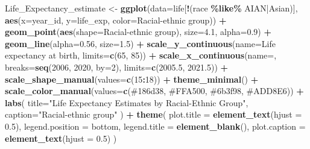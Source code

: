 \documentclass[
]{article}
\newenvironment{Shaded}{\begin{snugshade}}{\end{snugshade}}
\newcommand{\AttributeTok}[1]{\textcolor[rgb]{0.13,0.29,0.53}{#1}}
\newcommand{\DecValTok}[1]{\textcolor[rgb]{0.00,0.00,0.81}{#1}}
\newcommand{\FloatTok}[1]{\textcolor[rgb]{0.00,0.00,0.81}{#1}}
\newcommand{\FunctionTok}[1]{\textcolor[rgb]{0.13,0.29,0.53}{\textbf{#1}}}
\newcommand{\NormalTok}[1]{#1}
\newcommand{\OtherTok}[1]{\textcolor[rgb]{0.56,0.35,0.01}{#1}}
\newcommand{\SpecialCharTok}[1]{\textcolor[rgb]{0.81,0.36,0.00}{\textbf{#1}}}
\newcommand{\StringTok}[1]{\textcolor[rgb]{0.31,0.60,0.02}{#1}}
\begin{document}
\begin{Shaded}
\begin{Highlighting}[]
\NormalTok{Life\_Expectancy\_estimate }\OtherTok{\textless{}{-}} \FunctionTok{ggplot}\NormalTok{(}\AttributeTok{data=}\NormalTok{life[}\SpecialCharTok{!}\NormalTok{(race }\SpecialCharTok{\%like\%} \StringTok{\textquotesingle{}AIAN|Asian\textquotesingle{}}\NormalTok{)], }\FunctionTok{aes}\NormalTok{(}\AttributeTok{x=}\NormalTok{year\_id, }\AttributeTok{y=}\NormalTok{life\_exp, }\AttributeTok{color=}\StringTok{\textasciigrave{}}\AttributeTok{Racial{-}ethnic group}\StringTok{\textasciigrave{}}\NormalTok{)) }\SpecialCharTok{+}
  \FunctionTok{geom\_point}\NormalTok{(}\FunctionTok{aes}\NormalTok{(}\AttributeTok{shape=}\StringTok{\textasciigrave{}}\AttributeTok{Racial{-}ethnic group}\StringTok{\textasciigrave{}}\NormalTok{), }\AttributeTok{size=}\FloatTok{4.1}\NormalTok{, }\AttributeTok{alpha=}\FloatTok{0.9}\NormalTok{) }\SpecialCharTok{+}
  \FunctionTok{geom\_line}\NormalTok{(}\AttributeTok{alpha=}\FloatTok{0.56}\NormalTok{, }\AttributeTok{size=}\FloatTok{1.5}\NormalTok{) }\SpecialCharTok{+}
  \FunctionTok{scale\_y\_continuous}\NormalTok{(}\AttributeTok{name=}\StringTok{\textquotesingle{}Life expectancy at birth\textquotesingle{}}\NormalTok{, }\AttributeTok{limits=}\FunctionTok{c}\NormalTok{(}\DecValTok{65}\NormalTok{, }\DecValTok{85}\NormalTok{)) }\SpecialCharTok{+}
  \FunctionTok{scale\_x\_continuous}\NormalTok{(}\AttributeTok{name=}\StringTok{\textquotesingle{}\textquotesingle{}}\NormalTok{, }\AttributeTok{breaks=}\FunctionTok{seq}\NormalTok{(}\DecValTok{2006}\NormalTok{, }\DecValTok{2020}\NormalTok{, }\AttributeTok{by=}\DecValTok{2}\NormalTok{), }\AttributeTok{limits=}\FunctionTok{c}\NormalTok{(}\FloatTok{2005.5}\NormalTok{, }\FloatTok{2021.5}\NormalTok{)) }\SpecialCharTok{+}
  \FunctionTok{scale\_shape\_manual}\NormalTok{(}\AttributeTok{values=}\FunctionTok{c}\NormalTok{(}\DecValTok{15}\SpecialCharTok{:}\DecValTok{18}\NormalTok{)) }\SpecialCharTok{+}
  \FunctionTok{theme\_minimal}\NormalTok{() }\SpecialCharTok{+}
  \FunctionTok{scale\_color\_manual}\NormalTok{(}\AttributeTok{values=}\FunctionTok{c}\NormalTok{(}\StringTok{\textquotesingle{}\#186d38\textquotesingle{}}\NormalTok{, }\StringTok{\textquotesingle{}\#FFA500\textquotesingle{}}\NormalTok{, }\StringTok{\textquotesingle{}\#6b3f98\textquotesingle{}}\NormalTok{, }\StringTok{\textquotesingle{}\#ADD8E6\textquotesingle{}}\NormalTok{)) }\SpecialCharTok{+}
  \FunctionTok{labs}\NormalTok{(}
    \AttributeTok{title=}\StringTok{"Life Expectancy Estimates by Racial{-}Ethnic Group"}\NormalTok{,}
    \AttributeTok{caption=}\StringTok{"Racial{-}ethnic group"} 
\NormalTok{  ) }\SpecialCharTok{+}
  \FunctionTok{theme}\NormalTok{(}
    \AttributeTok{plot.title =} \FunctionTok{element\_text}\NormalTok{(}\AttributeTok{hjust =} \FloatTok{0.5}\NormalTok{), }
    \AttributeTok{legend.position =} \StringTok{\textquotesingle{}bottom\textquotesingle{}}\NormalTok{,             }
    \AttributeTok{legend.title =} \FunctionTok{element\_blank}\NormalTok{(),         }
    \AttributeTok{plot.caption =} \FunctionTok{element\_text}\NormalTok{(}\AttributeTok{hjust =} \FloatTok{0.5}\NormalTok{) }
\NormalTok{  )}


\end{Highlighting}
\end{Shaded}
\end{document}
